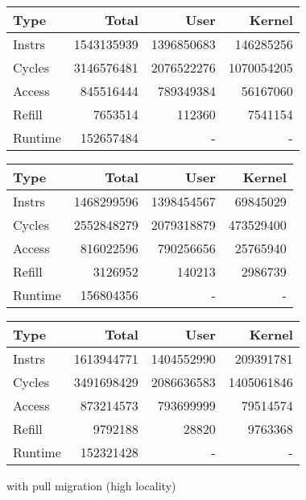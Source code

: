 \documentclass[11pt]{article}
\begin{document}
\begin{figure*}[!h]
	\caption{60 threads consisting of 48 hard processes and 12 easy processes}	
	\centering
	\begin{subtable}{.48\linewidth}
		\centering                 
		\begin{tabular}{l|rrr}
			Type    & Total      & User       & Kernel     \\
			\hline
			Instrs  & 1543135939 & 1396850683 & 146285256  \\ 
			Cycles  & 3146576481 & 2076522276 & 1070054205 \\ 
			Access  & 845516444  & 789349384  & 56167060   \\ 
			Refill  & 7653514    & 112360     & 7541154    \\ 
			Runtime & 152657484  & -          & -          \\
			\hline 
		\end{tabular}
		\caption{without pull migration (high locality)}
	\end{subtable}
	\hfill
	\begin{subtable}{.48\linewidth}
		\begin{tabular}{l|rrr}
			Type    & Total      & User       & Kernel    \\
			\hline
			Instrs  & 1468299596 & 1398454567 & 69845029  \\ 
			Cycles  & 2552848279 & 2079318879 & 473529400 \\ 
			Access  & 816022596  & 790256656  & 25765940  \\ 
			Refill  & 3126952    & 140213     & 2986739   \\ 
			Runtime & 156804356  & -          & -         \\
			\hline
		\end{tabular}
		\caption{with pull migration (high locality)}
	\end{subtable}
	\begin{subtable}{.48\textwidth}
		\centering                 
		\begin{tabular}{l|rrr}       
			Type    & Total      & User       & Kernel     \\
			\hline
			Instrs  & 1613944771 & 1404552990 & 209391781  \\ 
			Cycles  & 3491698429 & 2086636583 & 1405061846 \\ 
			Access  & 873214573  & 793699999  & 79514574   \\ 
			Refill  & 9792188    & 28820      & 9763368    \\ 
			Runtime & 152321428  & -          & -          \\ 

\end{tabular}
\end{subtable}
\end{figure*}
\end{document}
